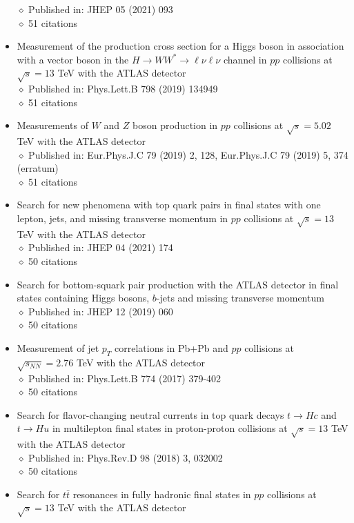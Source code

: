 \documentclass[margin, 10pt]{res} %
\begin{document}
\begin{resume}
\begin{itemize}
$\diamond$ Published in: JHEP 05 (2021) 093\\
$\diamond$ 51 citations
\item Measurement of the production cross section for a Higgs boson in association with a vector boson in the $H \rightarrow WW^{*} \rightarrow \ell\nu\ell\nu$ channel in $pp$ collisions at $\sqrt{s} = 13$ TeV with the ATLAS detector\\
$\diamond$ Published in: Phys.Lett.B 798 (2019) 134949\\
$\diamond$ 51 citations
\item Measurements of $W$ and $Z$ boson production in $pp$ collisions at $\sqrt{s} = 5.02$ TeV with the ATLAS detector\\
$\diamond$ Published in: Eur.Phys.J.C 79 (2019) 2, 128, Eur.Phys.J.C 79 (2019) 5, 374 (erratum)\\
$\diamond$ 51 citations
\item Search for new phenomena with top quark pairs in final states with one lepton, jets, and missing transverse momentum in $pp$ collisions at $\sqrt{s} = 13$ TeV with the ATLAS detector\\
$\diamond$ Published in: JHEP 04 (2021) 174\\
$\diamond$ 50 citations
\item Search for bottom-squark pair production with the ATLAS detector in final states containing Higgs bosons, $b$-jets and missing transverse momentum\\
$\diamond$ Published in: JHEP 12 (2019) 060\\
$\diamond$ 50 citations
\item Measurement of jet $p_{T}$ correlations in Pb+Pb and $pp$ collisions at $\sqrt{s_{NN}} = 2.76$ TeV with the ATLAS detector\\
$\diamond$ Published in: Phys.Lett.B 774 (2017) 379-402\\
$\diamond$ 50 citations
\item Search for flavor-changing neutral currents in top quark decays $t \rightarrow Hc$ and $t \rightarrow Hu$ in multilepton final states in proton-proton collisions at $\sqrt{s} = 13$ TeV with the ATLAS detector\\
$\diamond$ Published in: Phys.Rev.D 98 (2018) 3, 032002\\
$\diamond$ 50 citations
\item Search for $t\bar{t}$ resonances in fully hadronic final states in $pp$ collisions at $\sqrt{s} = 13$ TeV with the ATLAS detector\\

\end{itemize}
\end{resume}
\end{document}
